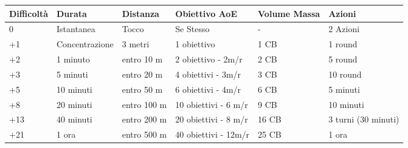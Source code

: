 \documentclass[a4paper,twoside,openany]{book}
\begin{document}
\bigskip

\begin{tabularx}{0.95\textwidth}{XXXXXX}
\hline
\textbf{Difficoltà} &\textbf{Durata} &\textbf{Distanza} &\textbf{Obiettivo  AoE} & \textbf{Volume  Massa} &\textbf{Azioni} \\
\hline
0	& Istantanea			& Tocco			& Se Stesso		&	-		& 2 Azioni\\
\hline
+1	& Concentrazione		& 3 metri		& 1 obiettivo	&	1 CB	& 1 round\\
\hline
+2	& 1 minuto				& entro 10 m	& 2 obiettivo - 2m/r&	2 CB	& 5 round\\
\hline
+3	& 5 minuti				& entro 20 m	& 4 obiettivi - 3m/r&	3 CB	& 10 round\\
\hline
+5	& 10 minuti				& entro 50 m	& 6 obiettivi - 4m/r&	6 CB	& 5 minuti\\
\hline
+8	& 20 minuti				& entro 100 m	& 10 obiettivi - 6 m/r&	9 CB	& 10 minuti\\
\hline
+13	& 40 minuti				& entro 200 m	& 20 obiettivi - 8 m/r&	16 CB	& 3 turni (30 minuti)\\
\hline
+21 & 1 ora					& entro 500 m	& 40 obiettivi - 12m/r&	25 CB	& 1 ora\\
\hline
\end{tabularx}
\bigskip
\end{document}

